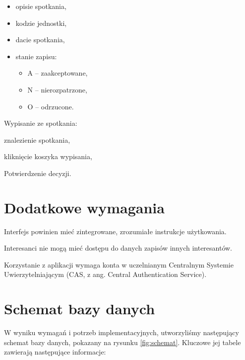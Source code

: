 \documentclass[licencjacka]{pracamgr}
\begin{document}
\begin{step}
\begin{step}
\begin{itemize}
							\item opisie spotkania,
							\item kodzie jednostki,
							\item dacie spotkania,
							\item stanie zapisu:
								\begin{itemize}
									\item A -- zaakceptowane,
									\item N -- nierozpatrzone,
									\item O -- odrzucone.
								\end{itemize}
						\end{itemize}
				\end{step}
			\item Wypisanie ze spotkania:
				\begin{step}
					\item znalezienie spotkania,
					\item kliknięcie koszyka wypisania,
					\item Potwierdzenie decyzji.
				\end{step}
	\end{step}
	

\section{Dodatkowe wymagania}
	\begin{step}
		\item Interfejs powinien mieć zintegrowane, zrozumiałe instrukcje użytkowania.
		\item Interesanci nie mogą mieć dostępu do danych zapisów innych interesantów.
		\item Korzystanie z aplikacji wymaga konta w uczelnianym Centralnym Systemie Uwierzytelniającym (CAS, z ang. Central Authentication Service).
	\end{step}
	
\section{Schemat bazy danych}

W wyniku wymagań i potrzeb implementacyjnych, utworzyliśmy następujący schemat bazy danych, pokazany na rysunku \ref{fig:schemat}. Kluczowe jej tabele zawierają następujące informacje:
\end{document}
